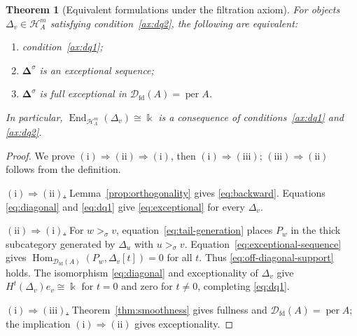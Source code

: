 \documentclass[11pt,a4paper]{article}
\newcommand{\D}{\mathcal D}
\renewcommand{\H}{\mathcal H}
\newcommand{\std}{\Delta}
\DeclareMathOperator{\fd}{fd}
\DeclareMathOperator{\Hom}{Hom}
\DeclareMathOperator{\End}{End}
\DeclareMathOperator{\per}{per}
\theoremstyle{plain}
\newtheorem{theorem}{Theorem}[section]
\theoremstyle{definition}
\numberwithin{equation}{section}
\begin{document}
\begin{theorem}[Equivalent formulations under the filtration axiom]
\label{thm:equivalence}
For objects $\std_v\in\H_A^m$ satisfying condition~\ref{ax:dq2},
the following are equivalent:
\begin{enumerate}[label=\textup{(\roman*)}]
\item condition~\ref{ax:dq1};
\item $\boldsymbol\std^\sigma$ is an exceptional sequence;
\item $\boldsymbol\std^\sigma$ is full exceptional in
      $\D_{\fd}(A)=\per A$.
\end{enumerate}
In particular, $\End_{\H_A^m}(\std_v)\cong\Bbbk$ is a consequence
of conditions~\ref{ax:dq1} and \ref{ax:dq2}.
\end{theorem}
\begin{proof}
We prove $(\mathrm{i})\Rightarrow(\mathrm{ii})\Rightarrow
(\mathrm{i})$, then $(\mathrm{i})\Rightarrow(\mathrm{iii})$;
$(\mathrm{iii})\Rightarrow(\mathrm{ii})$ follows from the definition.

\noindent\underline{$(\mathrm{i})\Rightarrow(\mathrm{ii})$.}
Lemma~\ref{prop:orthogonality} gives \eqref{eq:backward}.
Equations \eqref{eq:diagonal} and \eqref{eq:dq1} give
\eqref{eq:exceptional} for every $\std_v$.

\noindent\underline{$(\mathrm{ii})\Rightarrow(\mathrm{i})$.}
For $w>_\sigma v$, equation~\eqref{eq:tail-generation} places $P_w$
in the thick subcategory generated by $\std_u$ with $u>_\sigma v$.
Equation~\eqref{eq:exceptional-sequence} gives
$\Hom_{\D_{\fd}(A)}(P_w,\std_v[t])=0$ for all $t$.
Thus \eqref{eq:off-diagonal-support} holds.
The isomorphism \eqref{eq:diagonal} and exceptionality of
$\std_v$ give $H^t(\std_v)e_v\cong\Bbbk$ for $t=0$ and zero for
$t\neq0$, completing \eqref{eq:dq1}.

\noindent\underline{$(\mathrm{i})\Rightarrow(\mathrm{iii})$.}
Theorem~\ref{thm:smoothness} gives fullness and
$\D_{\fd}(A)=\per A$; the implication
$(\mathrm{i})\Rightarrow(\mathrm{ii})$ gives exceptionality.
\end{proof}
\end{document}
